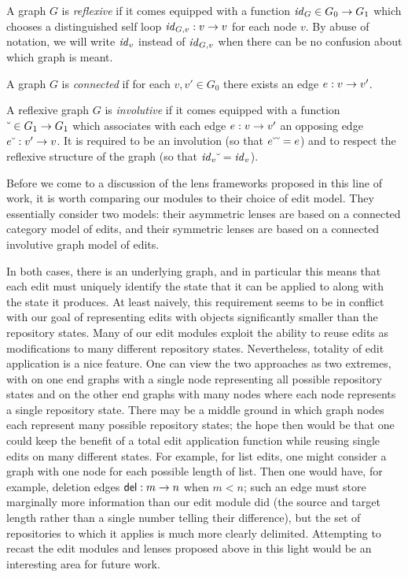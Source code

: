 \begin{definition}
    A graph $G$ is \emph{reflexive} if it comes equipped with a function
    $\mathit{id}_G \in G_0 \to G_1$ which chooses a distinguished self loop
    $\mathit{id}_{G,v} : v \to v$ for each node $v$. By abuse of notation, we
    will write $\mathit{id}_v$ instead of $\mathit{id}_{G,v}$ when there can be no confusion
    about which graph is meant.
\end{definition}

\begin{definition}
    A graph $G$ is \emph{connected} if for each $v,v'\in G_0$ there exists
    an edge $e : v \to v'$.
\end{definition}

\begin{definition}
    A reflexive graph $G$ is \emph{involutive} if it comes equipped with a
    function $\breve{\ } \in G_1 \to G_1$ which associates with each edge $e : v
    \to v'$ an opposing edge $e\breve{\ } : v' \to v$. It is required to
    be an involution (so that $e\breve{\ }\breve{\ } = e$) and to respect the
    reflexive structure of the graph (so that $\mathit{id}_v\breve{\ }=\mathit{id}_v$).
\end{definition}

Before we come to a discussion of the lens frameworks proposed in this line
of work, it is worth comparing our modules to their choice of edit model.
They essentially consider two models: their asymmetric lenses are based on a
connected category model of edits, and their symmetric lenses are based on a
connected involutive graph model of edits.

In both cases, there is an underlying graph, and in particular this means
that each edit must uniquely identify the state that it can be applied to
along with the state it produces. At least naively, this requirement seems
to be in conflict with our goal of representing edits with objects
significantly smaller than the repository states. Many of our edit modules
exploit the ability to reuse edits as modifications to many different
repository states. Nevertheless, totality of edit application is a nice
feature. One can view the two approaches as two extremes, with on one end
graphs with a single node representing all possible repository states and on
the other end graphs with many nodes where each node represents a single
repository state. There may be a middle ground in which graph nodes each
represent many possible repository states; the hope then would be that one
could keep the benefit of a total edit application function while reusing
single edits on many different states. For example, for list edits, one
might consider a graph with one node for each possible length of list. Then
one would have, for example, deletion edges $\mathsf{del} : m \to n$ when
$m<n$; such an edge must store marginally more information than our edit
module did (the source and target length rather than a single number telling
their difference), but the set of repositories to which it applies is much
more clearly delimited. Attempting to recast the edit modules and lenses
proposed above in this light would be an interesting area for future work.

